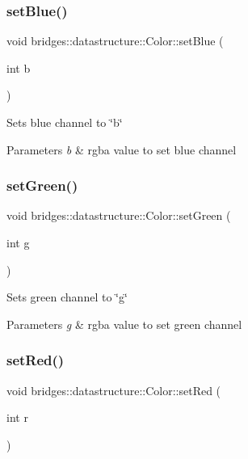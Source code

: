 \subsubsection{\texorpdfstring{set\+Blue()}{setBlue()}}
{\footnotesize\ttfamily void bridges\+::datastructure\+::\+Color\+::set\+Blue (\begin{DoxyParamCaption}\item[{int}]{b }\end{DoxyParamCaption})\hspace{0.3cm}{\ttfamily [inline]}}

Sets blue channel to \char`\"{}b\char`\"{} 
\begin{DoxyParams}{Parameters}
{\em b} & rgba value to set blue channel \\
\hline
\end{DoxyParams}
\mbox{\label{classbridges_1_1datastructure_1_1_color_ac1ac36232f13188eac0d7270a946261a}} 
\subsubsection{\texorpdfstring{set\+Green()}{setGreen()}}
{\footnotesize\ttfamily void bridges\+::datastructure\+::\+Color\+::set\+Green (\begin{DoxyParamCaption}\item[{int}]{g }\end{DoxyParamCaption})\hspace{0.3cm}{\ttfamily [inline]}}

Sets green channel to \char`\"{}g\char`\"{} 
\begin{DoxyParams}{Parameters}
{\em g} & rgba value to set green channel \\
\hline
\end{DoxyParams}
\mbox{\label{classbridges_1_1datastructure_1_1_color_a487be07319fe83e9642cd0387ebed33a}} 
\subsubsection{\texorpdfstring{set\+Red()}{setRed()}}
{\footnotesize\ttfamily void bridges\+::datastructure\+::\+Color\+::set\+Red (\begin{DoxyParamCaption}\item[{int}]{r }\end{DoxyParamCaption})\hspace{0.3cm}{\ttfamily [inline]}}


